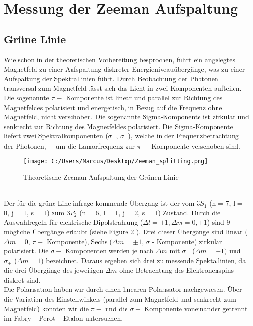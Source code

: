 \documentclass[10pt,a4paper]{article}
\begin{document}
\section{Messung der Zeeman Aufspaltung}


\subsection{Grüne Linie}

Wie schon in der theoretischen Vorbereitung besprochen, führt ein angelegtes Magnetfeld zu einer Aufspaltung diskreter Energieniveauübergänge, was zu einer Aufspaltung der Spektrallinien führt. Durch Beobachtung der Photonen transversal zum Magnetfeld lässt sich das Licht in zwei Komponenten aufteilen. Die sogenannte $\pi - $ Komponente ist linear und parallel zur Richtung des Magnetfeldes polarisiert und energetisch, in Bezug auf die Frequenz ohne Magnetfeld, nicht verschoben. Die sogenannte Sigma-Komponente ist zirkular und senkrecht zur Richtung des Magnetfeldes polarisiert. Die Sigma-Komponente liefert zwei Spektralkomponenten ($\sigma _{-}$, $\sigma _{+}$), welche in der Frequenzbetrachtung der Photonen, $\pm $ um   die Lamorfrequenz zur $\pi - $ Komponente verschoben sind.  
\\
\begin{figure}[h]
	\texttt{[image: C:/Users/Marcus/Desktop/Zeeman\_splitting.png]}
	\centering
	\caption{Theoretische Zeeman-Aufspaltung der Grünen Linie}
	\label{aufbau2}
\end{figure}
\\
Der für die grüne Line infrage kommende Übergang ist der vom $3S_{1}$ (n = 7, l = 0, j = 1, s = 1) zum $3P_{2}$ (n = 6, l = 1, j = 2, s = 1) Zustand. Durch die Auswahlregeln für elektrische Dipolstrahlung ($\Delta l = \pm 1 , \Delta m =  0,\pm1$) sind 9 mögliche Übergänge erlaubt (siehe Figure 2 ). Drei dieser Übergänge sind linear ($\Delta m = 0$, $\pi - $ Komponente), Sechs ($\Delta m = \pm 1$, $\sigma   $ - Komponente) zirkular polarisiert. Die $\sigma -  $ Komponenten  werden je nach $ \Delta m $ mit $\sigma _{-}  $ ($\Delta m = -1$) und $\sigma _{+}  $ ($\Delta m = 1$) bezeichnet.   Daraus ergeben sich drei zu messende Spektallinien, da die drei Übergänge des jeweiligen $\Delta m$ ohne Betrachtung des Elektronenspins diskret sind.
\\
Die Polarisation haben wir durch einen linearen Polarisator nachgewiesen. Über die Variation des Einstellwinkels (parallel zum Magnetfeld und senkrecht zum Magnetfeld) konnten wir die $\pi - $  und die $\sigma  - $ Komponente voneinander getrennt im Fabry – Perot – Etalon untersuchen. 
\end{document}
